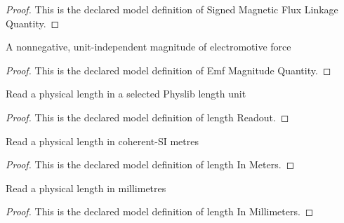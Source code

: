 \begin{proof}
  This is the declared model definition of Signed Magnetic Flux Linkage Quantity.
\end{proof}
\begin{definition}
  \label{def:physics:phyx-mini-0933:phyxminiproblems-problemphyxmini0933-emfmagnitudequantity}
  A nonnegative, unit-independent magnitude of electromotive force
\end{definition}
\begin{proof}
  This is the declared model definition of Emf Magnitude Quantity.
\end{proof}
\begin{definition}
  \label{def:physics:phyx-mini-0933:phyxminiproblems-problemphyxmini0933-lengthreadout}
  Read a physical length in a selected Physlib length unit
\end{definition}
\begin{proof}
  This is the declared model definition of length Readout.
\end{proof}
\begin{definition}
  \label{def:physics:phyx-mini-0933:phyxminiproblems-problemphyxmini0933-lengthinmeters}
  Read a physical length in coherent-SI metres
\end{definition}
\begin{proof}
  This is the declared model definition of length In Meters.
\end{proof}
\begin{definition}
  \label{def:physics:phyx-mini-0933:phyxminiproblems-problemphyxmini0933-lengthinmillimeters}
  Read a physical length in millimetres
\end{definition}
\begin{proof}
  This is the declared model definition of length In Millimeters.
\end{proof}
